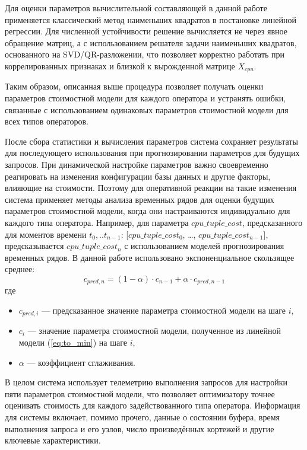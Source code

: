 Для оценки параметров вычислительной составляющей в данной работе применяется классический метод наименьших квадратов в постановке линейной регрессии. Для численной устойчивости решение вычисляется не через явное обращение матриц, а с использованием решателя задачи наименьших квадратов, основанного на SVD/QR-разложении, что позволяет корректно работать при коррелированных признаках и близкой к вырожденной матрице \(X_{cpu}\).

Таким образом, описанная выше процедура позволяет получать оценки
параметров стоимостной модели для каждого оператора и устранять ошибки, связанные с
использованием одинаковых параметров стоимостной модели для всех типов операторов.

После сбора статистики и вычисления параметров система сохраняет
результаты для последующего использования при прогнозировании параметров для будущих запросов. При динамической настройке параметров важно своевременно реагировать на изменения конфигурации базы данных и другие факторы, влияющие на стоимости. Поэтому для оперативной реакции на такие изменения система применяет методы анализа временных рядов для оценки будущих параметров стоимостной модели, когда они настраиваются индивидуально для каждого типа оператора.
Например, для параметра \(cpu\_tuple\_cost\), предсказанного для моментов времени
\(t_0,..t_{n-1}\): [\(cpu\_tuple\_cost_0\), \ldots, \(cpu\_tuple\_cost_{n-1}\)],
предсказывается \(cpu\_tuple\_cost_n\) с использованием моделей прогнозирования
временных рядов. В данной работе использовано
экспоненциальное скользящее среднее:
\begin{equation}
    c_{pred, n} = (1 - \alpha) \cdot c_{n-1} + \alpha \cdot c_{pred, n - 1}
\end{equation}
где
\begin{itemize}
    \item \(c_{pred, i}\) — предсказанное значение параметра стоимостной модели на шаге \(i\),
    \item \(c_i\) — значение параметра стоимостной модели, полученное из линейной модели
    (\ref{eq:to_min}) на шаге \(i\),
    \item \(\alpha\) — коэффициент сглаживания.
\end{itemize}

В целом система использует телеметрию выполнения запросов для настройки пяти параметров стоимостной модели, что позволяет оптимизатору точнее оценивать стоимость для каждого задействованного типа оператора. Информация для системы включает, помимо прочего, данные о состоянии буфера, время выполнения запроса и его узлов, число произведённых кортежей и другие ключевые характеристики.



